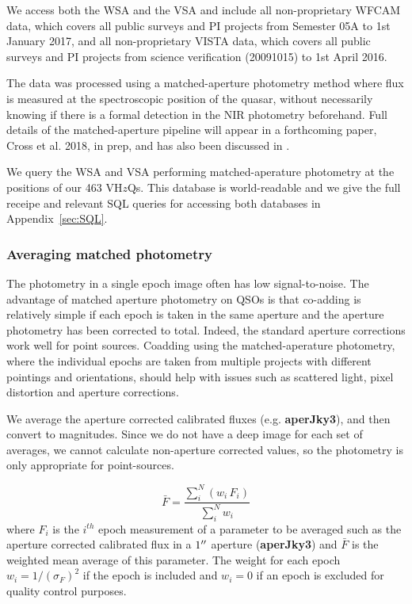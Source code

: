\documentclass[usenatbib]{mnras}
\begin{document}
We access both the WSA and the VSA and include all non-proprietary WFCAM data, which covers all
public surveys and PI projects from Semester 05A to 1st January 2017, and all
non-proprietary VISTA data, which covers all public surveys and PI projects from
science verification (20091015) to 1st April 2016. 

The data was processed using a matched-aperture photometry method
where flux is measured at the spectroscopic position of the quasar,
without necessarily knowing if there is a formal detection in the NIR
photometry beforehand.  Full details of the matched-aperture pipeline
will appear in a forthcoming paper, Cross et al.  2018, in prep, and
has also been discussed in \citet{Cross2013}.  

We query the WSA and VSA performing matched-aperature photometry at
the positions of our 463 VH$z$Qs. This database is world-readable and we give the full receipe
and relevant SQL queries for accessing both databases in Appendix~\ref{sec:SQL}.
   
    \subsubsection{Averaging matched photometry}
    The photometry in a single epoch image often has low
    signal-to-noise.  The advantage of matched aperture photometry on QSOs
    is that co-adding is relatively simple if each epoch is taken in the
    same aperture and the aperture photometry has been corrected to
    total. Indeed, the standard aperture corrections work well for point
    sources. Coadding using the matched-aperature photometry, where the
    individual epochs are taken from multiple projects with different
    pointings and orientations, should help with issues such as scattered
    light, pixel distortion and aperture corrections.
    
    We average the aperture corrected calibrated fluxes (e.g. {\bf aperJky3}), and
    then convert to magnitudes. Since we do not have a deep image for
    each set of averages, we cannot calculate non-aperture corrected values, so the
    photometry is only appropriate for point-sources. 

    \begin{equation}
      \bar{F} = \frac{\sum_i^N (w_i\,F_i)}{\sum_i^N w_i}  
      \label{eq:avg}
    \end{equation}
    where $F_i$ is the $i^{th}$ epoch measurement of a parameter to be
    averaged such as the aperture corrected calibrated flux in a $1\hbox{$^{\prime\prime}$}$ aperture
    ({\bf aperJky3}) and $\bar{F}$ is the weighted mean average of this parameter.
    The weight for each epoch $w_i=1/(\sigma_{F})^2$ if the epoch is included and 
    $w_i=0$ if an epoch is excluded for quality control purposes. 
    
\end{document}

